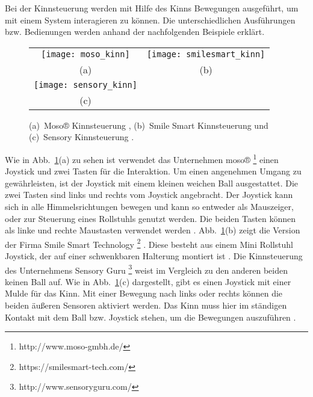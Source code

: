 Bei der Kinnsteuerung werden mit Hilfe des Kinns Bewegungen ausgeführt, um mit einem System interagieren zu können. Die unterschiedlichen Ausführungen bzw. Bedienungen werden anhand der nachfolgenden Beispiele erklärt.
%
\begin{figure}
\centering\small
\setlength{\tabcolsep}{0mm}	%
\begin{tabular}{c@{\hspace{15mm}}c} %
  \texttt{[image: moso\_kinn]} &
  \texttt{[image: smilesmart\_kinn]}
\\
  (a) & (b)
\\[5pt]	%
  \texttt{[image: sensory\_kinn]}
\\
  (c)
\end{tabular}
%
\caption{(a)~Moso® Kinnsteuerung \cite{MOSO}, (b)~Smile Smart Kinnsteuerung \cite{SMILESMART} und (c)~Sensory Kinnsteuerung \cite{SENSORY}.}
\label{fig:kinn}
\end{figure}
\newline \newline
Wie in Abb.~\ref{fig:kinn}(a) zu sehen ist verwendet das Unternehmen moso® %
\footnote{http://www.moso-gmbh.de/}
%
einen Joystick und zwei Tasten für die Interaktion. Um einen angenehmen Umgang zu gewährleisten, ist der Joystick mit einem kleinen weichen Ball ausgestattet. Die zwei Tasten sind links und rechts vom Joystick angebracht. Der Joystick kann sich in alle Himmelsrichtungen bewegen und kann so entweder als Mauszeiger, oder zur Steuerung eines Rollstuhls genutzt werden. Die beiden Tasten können als linke und rechte Maustasten verwendet werden \cite{MOSO}.
\newline
Abb.~\ref{fig:kinn}(b) zeigt die Version der Firma Smile Smart Technology %
\footnote{https://smilesmart-tech.com/}
%
. Diese besteht aus einem Mini Rollstuhl Joystick, der auf einer schwenkbaren Halterung montiert ist \cite{SMILESMART}.
\newline
Die Kinnsteuerung des Unternehmens Sensory Guru %
\footnote{http://www.sensoryguru.com/}
%
weist im Vergleich zu den anderen beiden keinen Ball auf. Wie in Abb.~\ref{fig:kinn}(c) dargestellt, gibt es einen Joystick mit einer Mulde für das Kinn. Mit einer Bewegung nach links oder rechts können die beiden äußeren Sensoren aktiviert werden. Das Kinn muss hier im ständigen Kontakt mit dem Ball bzw. Joystick stehen, um die Bewegungen auszuführen \cite{SENSORY}. 
\newline
